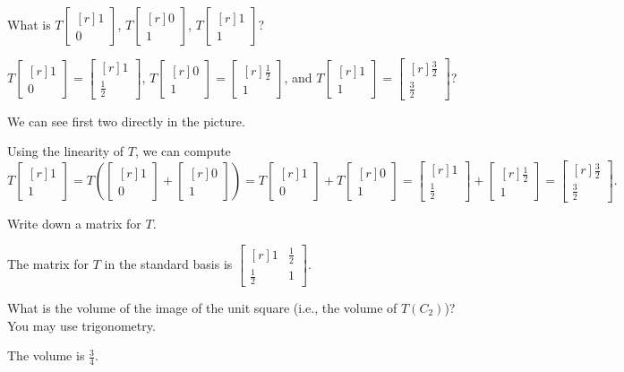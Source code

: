 \documentclass{problemset}
\newcommand{\mat}[1]{\begin{bmatrix*}[r]#1\end{bmatrix*}}
\begin{document}
	\begin{parts}
		\item What is $T\mat{1\\0}$, $T\mat{0\\1}$, $T\mat{1\\1}$?
			\begin{solution}
				$T\mat{1\\0}=\mat{1\\\frac{1}{2}}$,
				$T\mat{0\\1}=\mat{\frac{1}{2}\\1}$, and
				$T\mat{1\\1}=\mat{\frac{3}{2}\\\frac{3}{2}}$?

				We can see first two directly in the picture.

				Using the linearity of $T$, we can compute
				\[
					T\mat{1\\1}
					=T\left(\mat{1\\0}+\mat{0\\1}\right)
					=T\mat{1\\0}+T\mat{0\\1}
					=\mat{1\\\frac{1}{2}}+\mat{\frac{1}{2}\\1}
					=\mat{\frac{3}{2}\\\frac{3}{2}}.
				\]

			\end{solution}
		\item Write down a matrix for $T$.
			\begin{solution}
				The matrix for $T$ in the standard basis is
				$\mat{1&\frac{1}{2}\\\frac{1}{2}&1}$.
			\end{solution}
		\item What is the volume of the image of the unit square
			(i.e., the volume of $T(C_2)$)? You may use trigonometry.
			\begin{solution}
				The volume is $\frac{3}{4}$.
			\end{solution}
	\end{parts}
\end{document}
